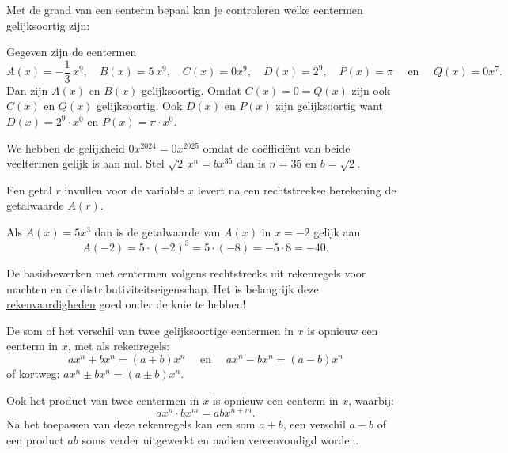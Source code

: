 \documentclass{ximera}
\begin{document}
Met de graad van een eenterm bepaal kan je controleren welke eentermen gelijksoortig zijn: 
\begin{example} 
Gegeven zijn de eentermen
\[
A(x) = -\frac{1}{3}\,x^9, \quad B(x) = 5\,x^9, \quad C(x) = 0x^9, \quad D(x) = 2^9, \quad P(x) = \pi \quad \text{ en } \quad Q(x) = 0 x^7.
\]
Dan zijn \(A(x)\) en \(B(x)\) gelijksoortig. Omdat \(C(x) = 0 = Q(x)\) zijn ook \(C(x)\) en \(Q(x)\) gelijksoortig. 
Ook \(D(x)\) en \(P(x)\) zijn gelijksoortig want \(D(x) = 2^9 \cdot x^0\) en \(P(x) = \pi \cdot x^0\).  
\end{example} 

\begin{example} 
We hebben de gelijkheid \(0x^{2024} = 0x^{2025}\) omdat de coëfficiënt van beide veeltermen gelijk is aan nul. Stel \(\sqrt{2}\,x^n = bx^{35}\) dan is \(n = 35\) en \(b = \sqrt{2}\).
\end{example} 


Een getal \(r\) invullen voor de variable \(x\) levert na een rechtstreekse berekening de getalwaarde \(A(r)\). 
\begin{example} 
Als \(A(x) = 5x^3\) dan is de getalwaarde van \(A(x)\) in \(x = -2\) gelijk aan 
\[
A(-2) = 5 \cdot (-2)^3 = 5 \cdot (-8) = - 5 \cdot 8 = -40.
\]
\end{example} 



De basisbewerken met eentermen volgens rechtstreeks uit rekenregels voor machten en de distributiviteitseigenschap. Het is belangrijk deze \href{https://wiskunde.opmaat.org/wiskundeplan/rekenvaardigheden/rekenvaardigheden/rekenvaardigheden_inleiding}{rekenvaardigheden} goed onder de knie te hebben!  


\begin{proposition}
	
De som of het verschil van twee gelijksoortige eentermen in \(x\) is opnieuw een eenterm in \(x\), met als rekenregels:
\[
ax^n + bx^n = (a+b)x^n \quad \text{ en } \quad ax^n - bx^n = (a-b)x^n
\]
of kortweg: \(ax^n \pm bx^n = (a\pm b)x^n\). 

Ook het product van twee eentermen in \(x\) is opnieuw een eenterm in \(x\), waarbij:
\[
ax^n \cdot bx^m = abx^{n+m}.
\]
Na het toepassen van deze rekenregels kan een som \(a+b\), een verschil \(a-b\) of een product \(ab\) soms verder uitgewerkt en nadien vereenvoudigd worden.

\end{proposition}
\end{document}
